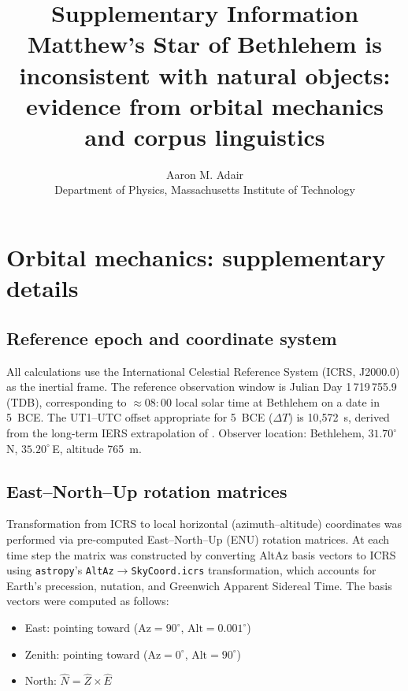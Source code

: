 \documentclass[11pt,a4paper]{article}
\title{\textbf{Supplementary Information}\\[6pt]
  \large Matthew's Star of Bethlehem is inconsistent with natural objects:
  evidence from orbital mechanics and corpus linguistics}
\author{Aaron M. Adair\\
  Department of Physics, Massachusetts Institute of Technology}
\date{}
\begin{document}
\maketitle

\section*{Orbital mechanics: supplementary details}

\subsection{Reference epoch and coordinate system}

All calculations use the International Celestial Reference System (ICRS,
J2000.0) as the inertial frame. The reference observation window is Julian
Day 1\,719\,755.9 (TDB), corresponding to $\approx\!08{:}00$ local solar time
at Bethlehem on a date in 5~BCE. The UT1--UTC offset appropriate for 5~BCE
($\Delta T$) is 10,572~s, derived from the long-term IERS extrapolation of
\cite{morrison2004}. Observer location: Bethlehem,
$31.70^\circ$\,N, $35.20^\circ$\,E, altitude 765~m.

\subsection{East--North--Up rotation matrices}

Transformation from ICRS to local horizontal (azimuth--altitude) coordinates
was performed via pre-computed East--North--Up (ENU) rotation matrices. At
each time step the matrix was constructed by converting AltAz basis vectors
to ICRS using \texttt{astropy}'s \texttt{AltAz}$\to$\texttt{SkyCoord.icrs}
transformation, which accounts for Earth's precession, nutation, and
Greenwich Apparent Sidereal Time. The basis vectors were computed as follows:

\begin{itemize}
  \item East: pointing toward ($\mathrm{Az}=90^\circ$, $\mathrm{Alt}=0.001^\circ$)
  \item Zenith: pointing toward ($\mathrm{Az}=0^\circ$, $\mathrm{Alt}=90^\circ$)
  \item North: $\hat{N} = \hat{Z} \times \hat{E}$
\end{itemize}
\end{document}
